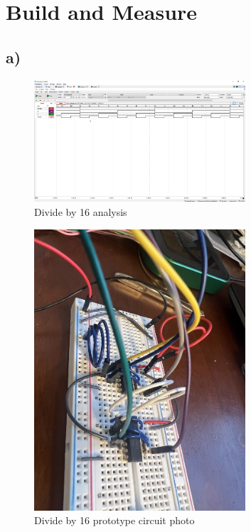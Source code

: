 \documentclass{article}
\begin{document}
	\section{Build and Measure}
	
	\subsection*{a)}
	
	\begin{figure}[H]
	    \centering
	    \includegraphics[width=0.7\textwidth]{2a-wfm}
	    \caption{Divide by 16 analysis}
	\end{figure}
	
	\begin{figure}[H]
	    \centering
	    \includegraphics[width=0.7\textwidth]{2a-photo}
	    \caption{Divide by 16 prototype circuit photo}
	\end{figure}
	
\end{document}
